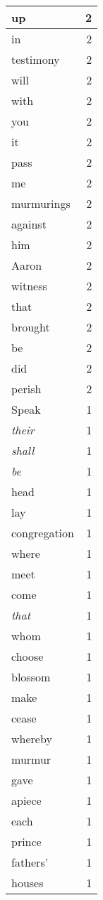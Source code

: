 \begin{center}
\begin{longtable}{l|r}
up & 2 \\ \hline
in & 2 \\ \hline
testimony & 2 \\ \hline
will & 2 \\ \hline
with & 2 \\ \hline
you & 2 \\ \hline
it & 2 \\ \hline
pass & 2 \\ \hline
me & 2 \\ \hline
murmurings & 2 \\ \hline
against & 2 \\ \hline
him & 2 \\ \hline
Aaron & 2 \\ \hline
witness & 2 \\ \hline
that & 2 \\ \hline
brought & 2 \\ \hline
be & 2 \\ \hline
did & 2 \\ \hline
perish & 2 \\ \hline
Speak & 1 \\ \hline
\emph{their} & 1 \\ \hline
\emph{shall} & 1 \\ \hline
\emph{be} & 1 \\ \hline
head & 1 \\ \hline
lay & 1 \\ \hline
congregation & 1 \\ \hline
where & 1 \\ \hline
meet & 1 \\ \hline
come & 1 \\ \hline
\emph{that} & 1 \\ \hline
whom & 1 \\ \hline
choose & 1 \\ \hline
blossom & 1 \\ \hline
make & 1 \\ \hline
cease & 1 \\ \hline
whereby & 1 \\ \hline
murmur & 1 \\ \hline
gave & 1 \\ \hline
apiece & 1 \\ \hline
each & 1 \\ \hline
prince & 1 \\ \hline
fathers' & 1 \\ \hline
houses & 1 \\ \hline

\end{longtable}
\end{center}
